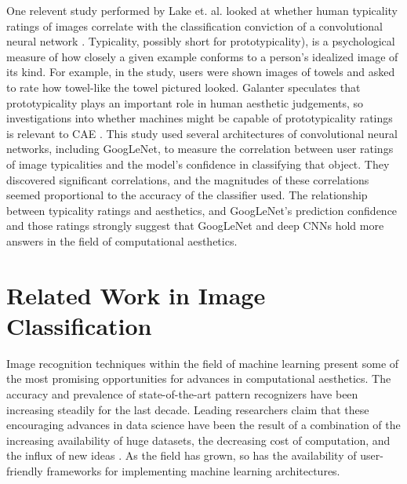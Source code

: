 \documentclass[midd]{thesis}
\begin{document}
One relevent study performed by Lake et. al. looked at whether human typicality ratings of images correlate with the classification conviction of a convolutional neural network \cite{lakedeep}. Typicality, possibly short for prototypicality), is a psychological measure of how closely a given example conforms to a person's idealized image of its kind. For example, in the study, users were shown images of towels and asked to rate how towel-like the towel pictured looked. Galanter speculates that prototypicality plays an important role in human aesthetic judgements, so investigations into whether machines might be capable of prototypicality ratings is relevant to CAE \cite{galanter-4}. This study used several architectures of convolutional neural networks, including GoogLeNet, to measure the correlation between user ratings of image typicalities and the model's confidence in classifying that object. They discovered significant correlations, and the magnitudes of these correlations seemed proportional to the accuracy of the classifier used. The relationship between typicality ratings and aesthetics, and GoogLeNet's prediction confidence and those ratings strongly suggest that GoogLeNet and deep CNNs hold more answers in the field of computational aesthetics.





















\section{Related Work in Image Classification}

Image recognition techniques within the field of machine learning present some of the most promising opportunities for advances in computational aesthetics. The accuracy and prevalence of state-of-the-art pattern recognizers have been increasing steadily for the last decade. Leading researchers claim that these encouraging advances in data science have been the result of a combination of the increasing availability of huge datasets, the decreasing cost of computation, and the influx of new ideas \cite{szegedy2014going}. As the field has grown, so has the availability of user-friendly frameworks for implementing machine learning architectures.
\end{document}
